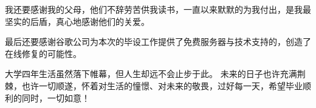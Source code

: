 \documentclass{morningstar}
\begin{document}
我还要感谢我的父母，他们不辞劳苦供我读书，一直以来默默的为我付出，是我最坚实的后盾，真心地感谢他们的关爱。

最后还要感谢谷歌公司为本次的毕设工作提供了免费服务器与技术支持的，创造了在线修复的可能性。

大学四年生活虽然落下帷幕，但人生却远不会止步于此。
未来的日子也许充满荆棘，也许一切顺遂，怀着对生活的憧憬、对未来的敬畏，过好每一天，希望毕业顺利的同时，一切如意！

\end{document}
